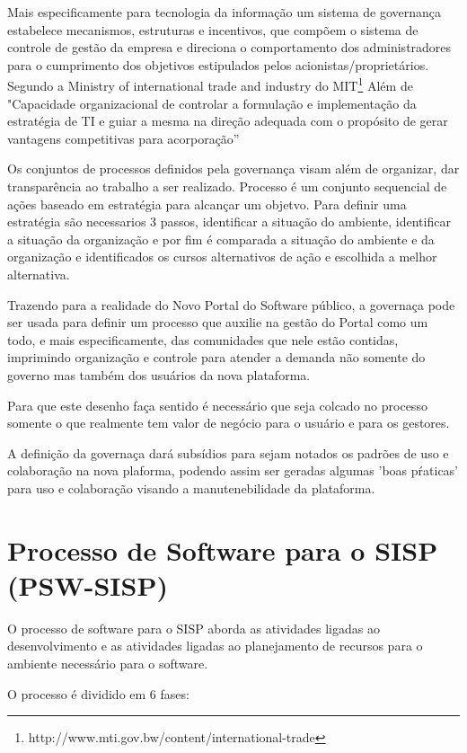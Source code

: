 Mais especificamente para tecnologia da informação um sistema de governança
estabelece mecanismos, estruturas e incentivos, que compõem o sistema de controle de 
gestão da empresa e direciona o comportamento dos administradores para o cumprimento 
dos objetivos estipulados pelos acionistas/proprietários.\cite{martin2004governancca}
%
Segundo a Ministry of international trade and industry do MIT\footnote{http://www.mti.gov.bw/content/international-trade} 
Além de "Capacidade organizacional de controlar a formulação e implementação da 
estratégia de TI e guiar a mesma na direção adequada com o propósito de gerar 
vantagens competitivas para acorporação”

Os conjuntos de processos definidos pela governança visam além de organizar, 
dar transparência ao trabalho a ser realizado.
%
Processo é um conjunto sequencial de ações baseado em estratégia para alcançar
um objetvo. Para definir uma estratégia são necessarios 3 passos, identificar a
situação do ambiente, identificar a situação da organização e por fim é comparada
a situação do ambiente e da organização e identificados os cursos alternativos
de ação e escolhida a melhor alternativa.\cite{molinarogestao}

Trazendo para a realidade do Novo Portal do Software público, a governaça pode ser usada para 
definir um processo que auxilie na gestão do Portal como um todo, e mais especificamente,
das comunidades que nele estão contidas, imprimindo organização e controle para atender 
a demanda não somente do governo mas também dos usuários da nova plataforma.

Para que este desenho faça sentido é necessário que seja colcado no processo somente o que 
realmente tem valor de negócio para o usuário e para os gestores.

A definição da governaça dará subsídios para sejam notados os padrões de uso e colaboração na
nova plaforma, podendo assim ser geradas algumas 'boas pŕaticas' para uso e colaboração
visando a manutenebilidade da plataforma.

\section{Processo de Software para o SISP (PSW-SISP)}

O processo de software para o SISP aborda as atividades ligadas ao desenvolvimento 
e as atividades ligadas ao planejamento de recursos para o ambiente necessário para
o software.

O processo é dividido em 6 fases:

